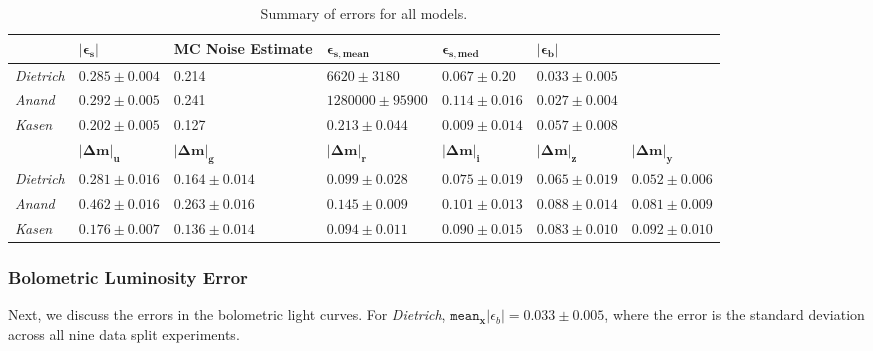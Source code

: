 \documentclass[fleqn,usenatbib,useAMS]{mnras}
\begin{document}
\begin{table*}
\centering
\caption{Summary of errors for all models. }
\begin{tabular}{lllllll}
\toprule
                                 & $\bm{|\epsilon_s|}$    & \textbf{MC Noise Estimate} & $\bm{\epsilon_{s, mean}}$   & $\bm{\epsilon_{s, med}}$ & $\bm{|\epsilon_b|}$    &                   \\ \toprule
\emph{Dietrich} & $0.285 \pm 0.004$ & 0.214             & $6620 \pm 3180$        & $0.067 \pm 0.20$    & $0.033 \pm 0.005$ &                   \\ 
\emph{Anand}    & $0.292 \pm 0.005$ & 0.241             & $1280000 \pm 95900 $ & $0.114\pm 0.016$    & $0.027 \pm 0.004$ &                   \\ 
\emph{Kasen}    & $0.202 \pm 0.005$ & 0.127             & $0.213 \pm 0.044$      & $0.009 \pm 0.014$   & $0.057 \pm 0.008$ &                   \\ \toprule
                                 & $\bm{|\Delta m|_u}$    & $\bm{|\Delta m|_g}$    & $\bm{|\Delta m|_r}$         & $\bm{|\Delta m|_i}$      & $\bm{|\Delta m|_z}$    & $\bm{|\Delta m|_y}$    \\ \toprule
                                 
\emph{Dietrich} & $0.281 \pm 0.016$ & $0.164 \pm 0.014$ & $0.099 \pm 0.028$      & $0.075 \pm 0.019$   & $0.065 \pm 0.019$ & $0.052 \pm 0.006$ \\ 
\emph{Anand}    & $0.462 \pm 0.016$ & $0.263 \pm 0.016$ & $0.145 \pm 0.009$      & $0.101 \pm 0.013$   & $0.088 \pm 0.014$ & $0.081 \pm 0.009$ \\ 
\emph{Kasen}    & $0.176 \pm 0.007$ & $0.136 \pm 0.014$ & $0.094 \pm 0.011$      & $0.090 \pm 0.015$   & $0.083 \pm 0.010$ & $0.092 \pm 0.010$ \\
\bottomrule
\end{tabular}
\label{table:all_errs}
\end{table*}

\subsubsection{Bolometric Luminosity Error}
Next, we discuss the errors in the bolometric light curves.
For \emph{Dietrich}, $\texttt{mean}_{\mathbf{x}}|\epsilon_b| = 0.033 \pm 0.005$, where the error is the standard deviation across all nine data split experiments. 
\end{document}
